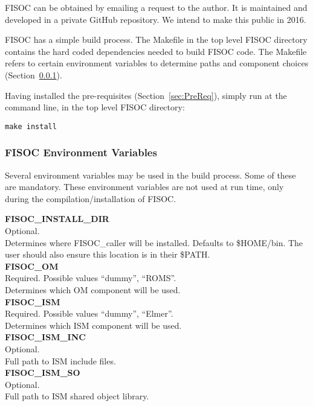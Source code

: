 \documentclass[12pt]{article}
\begin{document}
FISOC can be obtained by emailing a request to the author.  It is maintained and developed in a 
private GitHub repository.  We intend to make this public in 2016.

FISOC has a simple build process.  The Makefile in the top level FISOC directory contains the 
hard coded dependencies needed to build FISOC code.  The Makefile refers to certain 
environment variables to determine paths and component choices (Section~\ref{sec:EnvVars}). 

Having installed the pre-requisites (Section~\ref{sec:PreReq}), simply run at the command line, 
in the top level FISOC directory:
\begin{lstlisting}
make install
\end{lstlisting}


\subsubsection{FISOC Environment Variables}
\label{sec:EnvVars}

Several environment variables may be used in the build process. 
Some of these are mandatory. 
These environment variables are not used at run time, only during 
the compilation/installation of FISOC.

\begin{flushleft}
\textbf{FISOC\_INSTALL\_DIR}                       \\ 
Optional.                                          \\
Determines where FISOC\_caller will be installed. Defaults to \$HOME/bin. 
The user should also ensure this location is in their \$PATH. \\
\vspace{6pt}
\textbf{FISOC\_OM}                                 \\ 
Required. Possible values ``dummy'', ``ROMS''.     \\
Determines which OM component will be used.        \\
\vspace{6pt}
\textbf{FISOC\_ISM}                                \\
Required. Possible values ``dummy'', ``Elmer''.    \\
Determines which ISM component will be used.       \\
\vspace{6pt}
\textbf{FISOC\_ISM\_INC}                           \\ 
Optional.                                          \\
Full path to ISM include files.                    \\
\vspace{6pt}
\textbf{FISOC\_ISM\_SO}                            \\
Optional.                                          \\
Full path to ISM shared object library.            \\
\end{flushleft}
\end{document}
